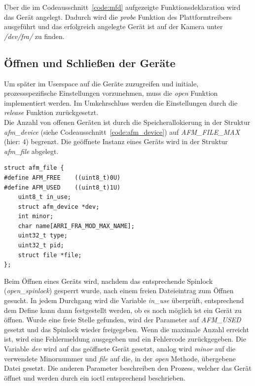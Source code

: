 Über die im Codeausschnitt~\ref{code:mfd} aufgezeigte Funktionsdeklaration wird das Gerät angelegt. Dadurch wird die \textit{probe} Funktion des Plattformtreibers ausgeführt und das erfolgreich angelegte Gerät ist auf der Kamera unter \textit{/dev/fra/} zu finden.


\subsection{Öffnen und Schließen der Geräte}
Um später im Userspace auf die Geräte zuzugreifen und initiale, prozessspezifische Einstellungen vorzunehmen, muss die \textit{open} Funktion implementiert werden. Im Umkehrschluss werden die Einstellungen durch die \textit{release} Funktion zurückgesetzt. \cite[Seite 58f.]{corbet2005linux} \\

Die Anzahl von offenen Geräten ist durch die Speicherallokierung in der Struktur \textit{afm\_device} (siehe Codeausschnitt~\ref{code:afm_device}) auf \textit{AFM\_FILE\_MAX} (hier: 4) begrenzt. Die geöffnete Instanz eines Geräts wird in der Struktur \textit{afm\_file} abgelegt.

\begin{lstfloat}
\begin{lstlisting}
struct afm_file {  
#define AFM_FREE    ((uint8_t)0U)
#define AFM_USED    ((uint8_t)1U)
	uint8_t in_use;
	struct afm_device *dev;
	int minor;
	char name[ARRI_FRA_MOD_MAX_NAME];
	uint32_t type;
	uint32_t pid;
	struct file *file;
};
\end{lstlisting}
\end{lstfloat}

Beim Öffnen eines Geräts wird, nachdem das entsprechende Spinlock (\textit{open\_spinlock}) gesperrt wurde, nach einem freien Dateieintrag zum Öffnen gesucht. In jedem Durchgang wird die Variable \textit{in\_use} überprüft, entsprechend dem Define kann dann festgestellt werden, ob es noch möglich ist ein Gerät zu öffnen. Wurde eine freie Stelle gefunden, wird der Parameter auf \textit{AFM\_USED} gesetzt und das Spinlock wieder freigegeben.
Wenn die maximale Anzahl erreicht ist, wird eine Fehlermeldung ausgegeben und ein Fehlercode zurückgegeben.
Die Variable \textit{dev} wird auf das geöffnete Gerät gesetzt, analog wird \textit{minor} auf die verwendete Minornummer und \textit{file} auf die, in der \textit{open} Methode, übergebene Datei gesetzt. 
Die anderen Parameter beschreiben den Prozess, welcher das Gerät öffnet und werden durch ein \ac{ioctl} entsprechend beschrieben.\\

